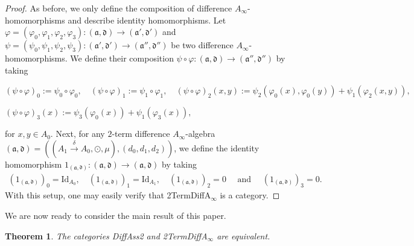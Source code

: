 \documentclass[a4paper,reqno,10pt]{amsart}
\theoremstyle{plain}
\newtheorem{thm}{Theorem}[section]
\theoremstyle{definition}
\theoremstyle{remark}
\begin{document}
\begin{proof}
    As before, we only define the composition of difference $A_\infty$-homomorphisms and describe identity homomorphisms. Let $ \varphi = (\varphi_0, \varphi_1, \varphi_2, \varphi_3) : (\mathfrak{a}, \mathfrak{d}) \rightarrow (\mathfrak{a}', \mathfrak{d}')$ and $\psi = (\psi_0, \psi_1, \psi_2, \psi_3) : (\mathfrak{a}', \mathfrak{d}') \rightarrow (\mathfrak{a}'' , \mathfrak{d}'' )$ be two difference $A_\infty$-homomorphisms. We define their composition $\psi \circ \varphi :  (\mathfrak{a}, \mathfrak{d}) \rightarrow  (\mathfrak{a}'', \mathfrak{d}'')$ by taking
    \begin{center}
        $(\psi \circ \varphi)_0 := \psi_0 \circ \varphi_0, \quad (\psi \circ \varphi)_1 := \psi_1 \circ \varphi_1, \quad
        (\psi \circ \varphi)_2 (x, y) := \psi_2 ( \varphi_0 (x), \varphi_0 (y)) + \psi_1 (\varphi_2 (x, y)), $
        \end{center}
        \begin{center}
        $(\psi \circ \varphi)_3 (x) := \psi_3 (\varphi_0 (x)) + \psi_1 (\varphi_3 (x)),$
    \end{center}
    for $x, y \in A_0$. Next, for any $2$-term difference $A_\infty$-algebra $(\mathfrak{a}, \mathfrak{d}) =  (  (A_1 \xrightarrow{\delta} A_0, \odot, \mu),  (d_0, d_1, d_2) )$, we define the identity homomorphism $1_{ (\mathfrak{a}, \mathfrak{d})} : (\mathfrak{a}, \mathfrak{d}) \rightarrow (\mathfrak{a}, \mathfrak{d})$ by taking
    \begin{align*}
        (1_{ (\mathfrak{a}, \mathfrak{d})})_0 = \mathrm{Id}_{A_0}, \quad (1_{ (\mathfrak{a}, \mathfrak{d})})_1 =\mathrm{Id}_{A_1}, \quad (1_{ (\mathfrak{a}, \mathfrak{d})})_2 = 0 \quad \text{ and } \quad (1_{ (\mathfrak{a}, \mathfrak{d})})_3 = 0.
    \end{align*}
    With this setup, one may easily verify that {\sf 2TermDiffA$_\infty$} is a category.
\end{proof}

We are now ready to consider the main result of this paper.

\begin{thm}\label{thm-main}
    The categories {\sf DiffAss2} and {\sf 2TermDiffA$_\infty$} are equivalent.
\end{thm}
\end{document}
